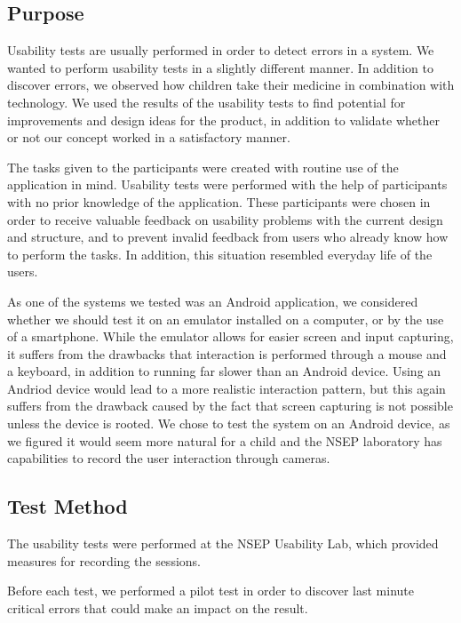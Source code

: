 \subsection{Purpose}
\label{sec:usabilitypurpose}
Usability tests are usually performed in order to detect errors in a system. We wanted to perform usability tests in a slightly different manner. In addition to discover errors, we observed how children take their medicine in combination with technology. We used the results of the usability tests to find potential for improvements and design ideas for the product, in addition to validate whether or not our concept worked in a satisfactory manner.
 
The tasks given to the participants were created with routine use of the application in mind. Usability tests were performed with the help of participants with no prior knowledge of the application. These participants were chosen in order to receive valuable feedback on usability problems with the current design and structure, and to prevent invalid feedback from users who already know how to perform the tasks. In addition, this situation resembled everyday life of the users.

As one of the systems we tested was an Android application, we considered whether we should test it on an emulator installed on a computer, or by the use of a smartphone. While the emulator allows for easier screen and input capturing, it suffers from the drawbacks that interaction is performed through a mouse and a keyboard, in addition to running far slower than an Android device. Using an Andriod device would lead to a more realistic interaction pattern, but this again suffers from the drawback caused by the fact that screen capturing is not possible unless the device is rooted. We chose to test the system on an Android device, as we figured it would seem more natural for a child and the NSEP laboratory has capabilities to record the user interaction through cameras.  


\subsection{Test Method}
\label{sec:testmethod}

The usability tests were performed at the NSEP Usability Lab, which provided measures for recording the sessions.  

Before each test, we performed a pilot test in order to discover last minute critical errors that could make an impact on the result.

